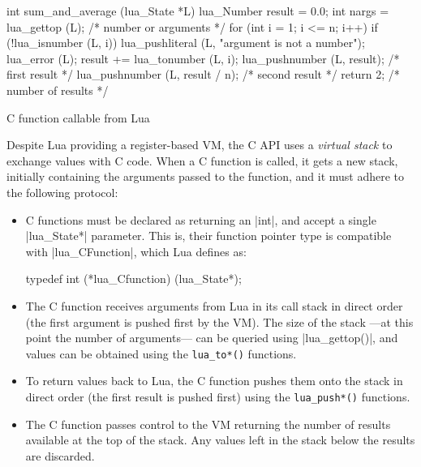 \begin{listing}[ht]
	\begin{ccode}
  int sum_and_average (lua_State *L) {
    lua_Number result = 0.0;
    int nargs = lua_gettop (L); /* number or arguments */
    for (int i = 1; i <= n; i++) {
      if (!lua_isnumber (L, i)) {
        lua_pushliteral (L, "argument is not a number");
        lua_error (L);
      }
      result += lua_tonumber (L, i);
    }
    lua_pushnumber (L, result);        /* first result */
    lua_pushnumber (L, result / n);   /* second result */
    return 2;                     /* number of results */
  }
	\end{ccode}
	\caption{C function callable from Lua}
	\label{lst:lua-c-api-example}
\end{listing}

Despite Lua providing a register-based VM, the C API uses a \emph{virtual
stack} to exchange values with C code. When a C function is called, it gets
a new stack, initially containing the arguments passed to the function, and
it must adhere to the following protocol:

\begin{itemize}
	\item C functions must be declared as returning an \Mc|int|, and accept
		a single \Mc|lua_State*| parameter. This is, their function pointer
		type is compatible with \Mc|lua_CFunction|, which Lua defines as:
		\begin{ccode}
			typedef int (*lua_Cfunction) (lua_State*);
		\end{ccode}

	\item The C function receives arguments from Lua in its call stack in
		direct order (the first argument is pushed first by the VM). The size of
		the stack —at this point the number of arguments— can be queried using
		\Mc|lua_gettop()|, and values can be obtained using the \verb|lua_to*()|
		functions.

	\item To return values back to Lua, the C function pushes them onto the
		stack in direct order (the first result is pushed first) using the
		\verb|lua_push*()| functions.

	\item The C function passes control to the VM returning the number of
		results available at the top of the stack. Any values left in the
		stack below the results are discarded.

\end{itemize}


